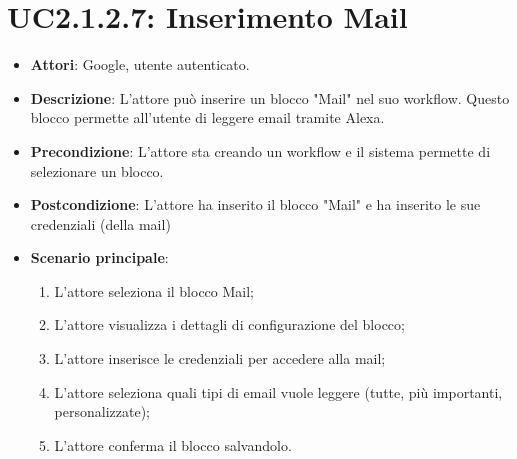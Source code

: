 \section{UC2.1.2.7: Inserimento Mail}
\label{UC2.1.2.7}
\begin{itemize}
	\item \textbf{Attori}: Google, utente autenticato.
	\item \textbf{Descrizione}: L'attore può inserire un blocco "Mail" nel suo workflow. Questo blocco permette all'utente di leggere email tramite Alexa.
	\item \textbf{Precondizione}: L'attore sta creando un workflow e il sistema permette di selezionare un blocco.
	\item \textbf{Postcondizione}: L'attore ha inserito il blocco "Mail" e ha inserito le sue credenziali (della mail)
	\item \textbf{Scenario principale}:
	\begin{enumerate} \item L'attore seleziona il blocco Mail;  \item L'attore visualizza i dettagli di configurazione del blocco; \item  L'attore inserisce le credenziali per accedere alla mail;  \item  L'attore seleziona quali tipi di email vuole leggere (tutte, più importanti, personalizzate); \item L'attore conferma il blocco salvandolo.\end{enumerate}
\end{itemize}

